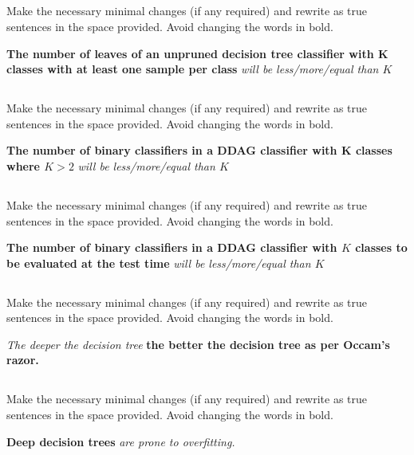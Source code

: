 \begin{frame}
\section{}
Make the necessary minimal changes  (if any required) and rewrite as true sentences in the space provided. Avoid changing the words in bold.

{\bf The number of leaves of an unpruned decision tree classifier with K classes with at least one sample per class} {\em will be less/more/equal than $K$}

\end{frame}


\begin{frame}
\section{}
Make the necessary minimal changes  (if any required) and rewrite as true sentences in the space provided. Avoid changing the words in bold.

{\bf The number of binary classifiers in a DDAG classifier with K classes where $K>2$} {\em will be less/more/equal than $K$}

\end{frame}


\begin{frame}
\section{}
Make the necessary minimal changes  (if any required) and rewrite as true sentences in the space provided. Avoid changing the words in bold.

{\bf The number of binary classifiers in a DDAG classifier with $K$ classes to be evaluated at the test time } {\em will be less/more/equal than $K$}


\end{frame}


\begin{frame}
\section{}
Make the necessary minimal changes  (if any required) and rewrite as true sentences in the space provided. Avoid changing the words in bold.

{\em The deeper the decision tree} {\bf the better the decision tree as per Occam's razor.}

\end{frame}


\begin{frame}
\section{}
Make the necessary minimal changes  (if any required) and rewrite as true sentences in the space provided. Avoid changing the words in bold.

{\bf Deep decision trees} {\em are prone to
overfitting.}
\end{frame}
